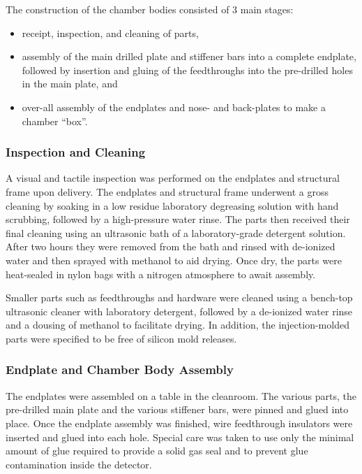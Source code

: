 The construction of the chamber bodies consisted of 3 main stages:
\begin{itemize}
\item receipt, inspection, and cleaning of parts,
\item assembly of the main drilled plate and stiffener bars into a complete endplate,
followed by insertion and gluing of the feedthroughs into the pre-drilled holes 
in the main plate, and 
\item over-all assembly of the endplates and nose- and back-plates to make
a chamber ``box''.
\end{itemize}

\subsubsection{Inspection and Cleaning}

A visual and tactile inspection was performed on the endplates and 
structural frame upon delivery.  The endplates and structural 
frame underwent a gross cleaning by soaking in a low residue laboratory 
degreasing solution with hand scrubbing, followed by a high-pressure water 
rinse. The parts then received their final cleaning using an ultrasonic 
bath of a laboratory-grade detergent solution.  After two hours they were
removed from the bath and rinsed with de-ionized water and then sprayed 
with methanol to aid drying. Once dry, the parts were heat-sealed in nylon 
bags with a nitrogen atmosphere to await assembly.

Smaller parts such as feedthroughs and hardware were cleaned using a 
bench-top ultrasonic cleaner with laboratory detergent, followed by a 
de-ionized water rinse and a dousing of methanol to facilitate drying.  
In addition, the injection-molded parts were specified to be free of silicon 
mold releases.
 
\subsubsection{Endplate and Chamber Body Assembly}

The endplates were assembled on a table in the cleanroom.  The various parts,
the pre-drilled main plate and the various stiffener bars, were pinned
and glued into place.  Once the endplate assembly was finished,
wire feedthrough insulators were inserted and glued into each hole. Special care was 
taken to use only the minimal amount of glue required to provide a solid gas 
seal and to prevent glue contamination inside the detector.  


